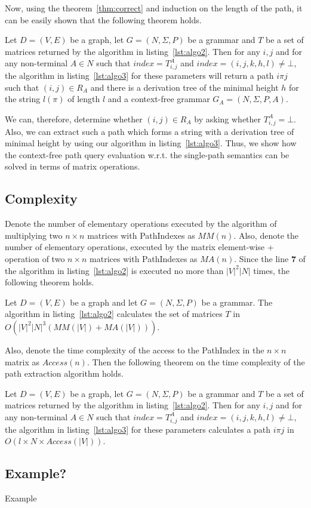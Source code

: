 Now, using the theorem~\ref{thm:correct} and induction on the length of the path, it can be easily shown that the following theorem holds.

\begin{mytheorem}\label{thm:correct_extraction}
	Let $D = (V,E)$ be a graph, let $G =(N,\Sigma,P)$ be a grammar and $T$ be a set of matrices returned by the algorithm in listing~\ref{lst:algo2}. Then for any $i, j$ and for any non-terminal $A \in N$ such that $index = T^A_{i,j}$ and $index = (i,j,k,h,l) \neq \bot$, the algorithm in listing~\ref{lst:algo3} for these parameters will return a path $i \pi j$ such that $(i,j) \in R_A$ and there is a derivation tree of the minimal height $h$ for the string $l(\pi)$ of length $l$ and a context-free grammar $G_A = (N,\Sigma,P,A)$.
\end{mytheorem}

We can, therefore, determine whether $(i,j) \in R_A$ by asking whether $T^A_{i,j} = \bot$. Also, we can extract such a path which forms a string with a derivation tree of minimal height by using our algorithm in listing~\ref{lst:algo3}. Thus, we show how the context-free path query evaluation w.r.t. the single-path semantics can be solved in terms of matrix operations.

\subsection{Complexity}

Denote the number of elementary operations executed by the algorithm of multiplying two $n \times n$ matrices with PathIndexes as $MM(n)$. Also, denote the number of elementary operations, executed by the matrix element-wise + operation of two $n \times n$ matrices with PathIndexes as $MA(n)$. Since the line \textbf{7} of the algorithm in listing~\ref{lst:algo2} is executed no more than $|V|^2|N|$ times, the following theorem holds.

\begin{mytheorem}\label{thm:time}
	Let $D = (V,E)$ be a graph and let $G =(N,\Sigma,P)$ be a grammar. The algorithm in listing~\ref{lst:algo2} calculates the set of matrices $T$ in $O(|V|^2|N|^3(MM(|V|) + MA(|V|)))$.
\end{mytheorem}

Also, denote the time complexity of the access to the PathIndex in the $n \times n$ matrix as $Access(n)$. Then the following theorem on the time complexity of the path extraction algorithm holds.

\begin{mytheorem}\label{thm:time_extraction}
	Let $D = (V,E)$ be a graph, let $G =(N,\Sigma,P)$ be a grammar and $T$ be a set of matrices returned by the algorithm in listing~\ref{lst:algo2}. Then for any $i, j$ and for any non-terminal $A \in N$ such that $index = T^A_{i,j}$ and $index = (i,j,k,h,l) \neq \bot$, the algorithm in listing~\ref{lst:algo3} for these parameters calculates a path $i \pi j$ in $O(l \times N \times Access(|V|))$.
\end{mytheorem}

\subsection{Example?}
Example